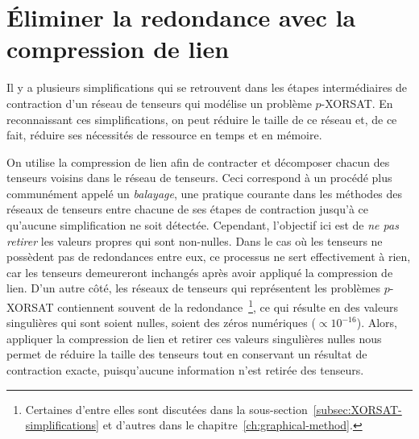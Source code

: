 \section{Éliminer la redondance avec la compression de lien}\label{sec:eliminate-redundancy-with-bond-compression}
Il y a plusieurs simplifications qui se retrouvent dans les étapes intermédiaires de contraction d'un réseau de tenseurs qui modélise un problème $p$-XORSAT.
En reconnaissant ces simplifications, on peut réduire le taille de ce réseau et, de ce fait, réduire ses nécessités de ressource en temps et en mémoire.

On utilise la compression de lien afin de contracter et décomposer chacun des tenseurs voisins dans le réseau de tenseurs.
Ceci correspond à un procédé plus communément appelé un \emph{balayage}, une pratique courante dans les méthodes des réseaux de tenseurs entre chacune de ses étapes de contraction jusqu'à ce qu'aucune simplification ne soit détectée.
Cependant, l'objectif ici est de \emph{ne pas retirer} les valeurs propres qui sont non-nulles.
Dans le cas où les tenseurs ne possèdent pas de redondances entre eux, ce processus ne sert effectivement à rien, car les tenseurs demeureront inchangés après avoir appliqué la compression de lien.
D'un autre côté, les réseaux de tenseurs qui représentent les problèmes $p$-XORSAT contiennent souvent de la redondance~\footnote{Certaines d'entre elles sont discutées dans la sous-section~\ref{subsec:XORSAT-simplifications} et d'autres dans le chapitre~\ref{ch:graphical-method}.}, ce qui résulte en des valeurs singulières qui sont soient nulles, soient des zéros numériques ($\propto 10^{-16}$).
Alors, appliquer la compression de lien et retirer ces valeurs singulières nulles nous permet de réduire la taille des tenseurs tout en conservant un résultat de contraction exacte, puisqu'aucune information n'est retirée des tenseurs.

